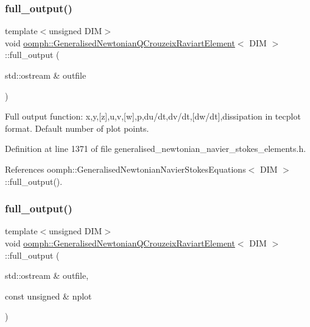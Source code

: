 \subsubsection{\texorpdfstring{full\+\_\+output()}{full\_output()}\hspace{0.1cm}{\footnotesize\ttfamily [1/2]}}
{\footnotesize\ttfamily template$<$unsigned D\+IM$>$ \\
void \hyperlink{classoomph_1_1GeneralisedNewtonianQCrouzeixRaviartElement}{oomph\+::\+Generalised\+Newtonian\+Q\+Crouzeix\+Raviart\+Element}$<$ D\+IM $>$\+::full\+\_\+output (\begin{DoxyParamCaption}\item[{std\+::ostream \&}]{outfile }\end{DoxyParamCaption})\hspace{0.3cm}{\ttfamily [inline]}}



Full output function\+: x,y,\mbox{[}z\mbox{]},u,v,\mbox{[}w\mbox{]},p,du/dt,dv/dt,\mbox{[}dw/dt\mbox{]},dissipation in tecplot format. Default number of plot points. 



Definition at line 1371 of file generalised\+\_\+newtonian\+\_\+navier\+\_\+stokes\+\_\+elements.\+h.



References oomph\+::\+Generalised\+Newtonian\+Navier\+Stokes\+Equations$<$ D\+I\+M $>$\+::full\+\_\+output().

\mbox{\label{classoomph_1_1GeneralisedNewtonianQCrouzeixRaviartElement_ab1fbf72fd8f16795905b03faa8ad9076}} 
\subsubsection{\texorpdfstring{full\+\_\+output()}{full\_output()}\hspace{0.1cm}{\footnotesize\ttfamily [2/2]}}
{\footnotesize\ttfamily template$<$unsigned D\+IM$>$ \\
void \hyperlink{classoomph_1_1GeneralisedNewtonianQCrouzeixRaviartElement}{oomph\+::\+Generalised\+Newtonian\+Q\+Crouzeix\+Raviart\+Element}$<$ D\+IM $>$\+::full\+\_\+output (\begin{DoxyParamCaption}\item[{std\+::ostream \&}]{outfile,  }\item[{const unsigned \&}]{nplot }\end{DoxyParamCaption})\hspace{0.3cm}{\ttfamily [inline]}}




